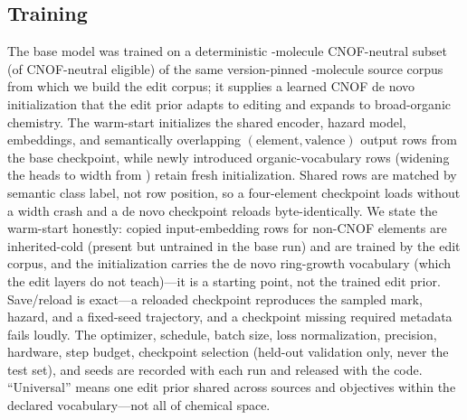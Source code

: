 \subsection{Training}
The base model was trained on a deterministic -molecule CNOF-neutral subset
(of  CNOF-neutral eligible) of the same version-pinned
-molecule source corpus from which we build the edit corpus; it supplies a
learned CNOF de novo initialization that the edit prior adapts to editing and expands to broad-organic
chemistry. The warm-start initializes the shared encoder, hazard model, embeddings, and semantically
overlapping $(\text{element},\text{valence})$ output rows from the base checkpoint, while newly introduced
organic-vocabulary rows (widening the heads to width  from
) retain fresh initialization. Shared rows are matched by semantic class label,
not row position, so a four-element checkpoint loads without a width crash and a de novo checkpoint reloads
byte-identically. We state the warm-start honestly: copied input-embedding rows for non-CNOF elements are
inherited-cold (present but untrained in the base run) and are trained by the edit corpus, and the
initialization carries the de novo ring-growth vocabulary (which the edit layers do not teach)---it is a
starting point, not the trained edit prior. Save/reload is exact---a reloaded checkpoint reproduces the sampled mark, hazard, and a fixed-seed
trajectory, and a checkpoint missing required metadata fails loudly. The optimizer, schedule, batch size,
loss normalization, precision, hardware, step budget, checkpoint selection (held-out validation only, never
the test set), and seeds are recorded with each run and released with the code. ``Universal'' means one
edit prior shared across sources and objectives within the declared vocabulary---not all of chemical
space.
